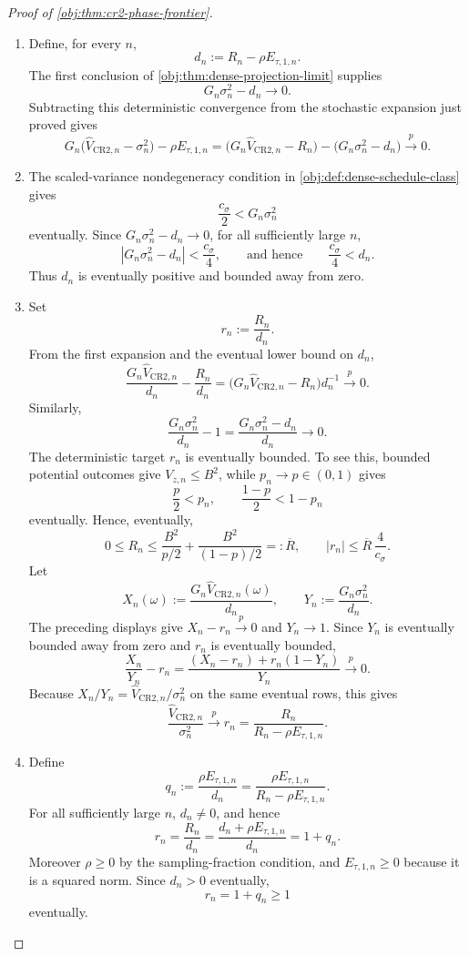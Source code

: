 \begin{proof}[Proof of \cref{obj:thm:cr2-phase-frontier}]
\begin{enumerate}
\item Define, for every \(n\),
\[
d_n:=R_n-\rho E_{\tau,1,n}.
\]
The first conclusion of \cref{obj:thm:dense-projection-limit} supplies
\[
G_n\sigma_n^2-d_n\to0 .
\]
Subtracting this deterministic convergence from the stochastic expansion just proved gives
\[
G_n\bigl(\widehat V_{\mathrm{CR2},n}-\sigma_n^2\bigr)
-\rho E_{\tau,1,n}
=
\bigl(G_n\widehat V_{\mathrm{CR2},n}-R_n\bigr)
-
\bigl(G_n\sigma_n^2-d_n\bigr)
\xrightarrow{p}0 .
\]

\item The scaled-variance nondegeneracy condition in \cref{obj:def:dense-schedule-class} gives
\[
\frac{c_\sigma}{2}<G_n\sigma_n^2
\]
eventually. Since \(G_n\sigma_n^2-d_n\to0\), for all sufficiently large \(n\),
\[
\left|G_n\sigma_n^2-d_n\right|<\frac{c_\sigma}{4},
\qquad\text{and hence}\qquad
\frac{c_\sigma}{4}<d_n .
\]
Thus \(d_n\) is eventually positive and bounded away from zero. %

\item Set
\[
r_n:=\frac{R_n}{d_n}.
\]
From the first expansion and the eventual lower bound on \(d_n\),
\[
\frac{G_n\widehat V_{\mathrm{CR2},n}}{d_n}-\frac{R_n}{d_n}
=
\bigl(G_n\widehat V_{\mathrm{CR2},n}-R_n\bigr)d_n^{-1}
\xrightarrow{p}0 .
\]
Similarly,
\[
\frac{G_n\sigma_n^2}{d_n}-1
=
\frac{G_n\sigma_n^2-d_n}{d_n}
\to0 .
\]
The deterministic target \(r_n\) is eventually bounded. To see this, bounded potential outcomes give \(V_{z,n}\le B^2\), while \(p_n\to p\in(0,1)\) gives
\[
\frac{p}{2}<p_n,
\qquad
\frac{1-p}{2}<1-p_n
\]
eventually. Hence, eventually,
\[
0\le R_n
\le
\frac{B^2}{p/2}+
\frac{B^2}{(1-p)/2}
=:\overline R,
\qquad
|r_n|\le \overline R\,\frac{4}{c_\sigma} .
\]
Let
\[
X_n(\omega):=\frac{G_n\widehat V_{\mathrm{CR2},n}(\omega)}{d_n},
\qquad
Y_n:=\frac{G_n\sigma_n^2}{d_n} .
\]
The preceding displays give \(X_n-r_n\xrightarrow{p}0\) and \(Y_n\to1\). Since \(Y_n\) is eventually bounded away from zero and \(r_n\) is eventually bounded,
\[
\frac{X_n}{Y_n}-r_n
=
\frac{(X_n-r_n)+r_n(1-Y_n)}{Y_n}
\xrightarrow{p}0 .
\]
Because \(X_n/Y_n=\widehat V_{\mathrm{CR2},n}/\sigma_n^2\) on the same eventual rows, this gives
\[
\frac{\widehat V_{\mathrm{CR2},n}}{\sigma_n^2}
\xrightarrow{p}
r_n
=
\frac{R_n}{R_n-\rho E_{\tau,1,n}} .
\]

\item Define
\[
q_n:=\frac{\rho E_{\tau,1,n}}{d_n}
=
\frac{\rho E_{\tau,1,n}}{R_n-\rho E_{\tau,1,n}} .
\]
For all sufficiently large \(n\), \(d_n\ne0\), and hence
\[
r_n
=
\frac{R_n}{d_n}
=
\frac{d_n+\rho E_{\tau,1,n}}{d_n}
=
1+q_n .
\]
Moreover \(\rho\ge0\) by the sampling-fraction condition, and \(E_{\tau,1,n}\ge0\) because it is a squared norm. Since \(d_n>0\) eventually,
\[
r_n=1+q_n\ge1
\]
eventually. %


\end{enumerate}
\end{proof}
